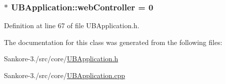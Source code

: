\hypertarget{class_u_b_application_a69b7fb1f61b12d6d98ea689e4073d809}{
\subsubsection[{web\-Controller}]{ $\ast$ U\-B\-Application\-::web\-Controller = 0\hspace{0.3cm}{\ttfamily [static]}}}\label{d8/d81/class_u_b_application_a69b7fb1f61b12d6d98ea689e4073d809}


Definition at line 67 of file U\-B\-Application.\-h.



The documentation for this class was generated from the following files\-:\begin{DoxyCompactItemize}
\item 
Sankore-\/3./src/core/\hyperlink{_u_b_application_8h}{U\-B\-Application.\-h}\item 
Sankore-\/3./src/core/\hyperlink{_u_b_application_8cpp}{U\-B\-Application.\-cpp}\end{DoxyCompactItemize}
